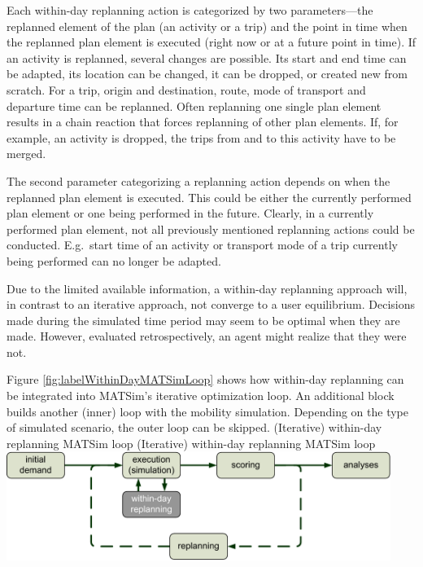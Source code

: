 Each within-day replanning action is categorized by two parameters---the replanned element of the plan (an activity or a trip) and the point in time when the replanned plan element is executed (right now or at a future point in time). If an activity is replanned, several changes are possible. Its start and end time can be adapted, its location can be changed, it can be dropped, or created new from scratch. For a trip, origin and destination, route, mode of transport and departure time can be replanned. Often replanning one single plan element results in a chain reaction that forces replanning of other plan elements. If, for example, an activity is dropped, the trips from and to this activity have to be merged.

The second parameter categorizing a replanning action depends on when the replanned plan element is executed. This could be either the currently performed plan element or one being performed in the future. Clearly, in a currently performed plan element, not all previously mentioned replanning actions could be conducted. E.g.\ start time of an activity or transport mode of a trip currently being performed can no longer be adapted.

Due to the limited available information, a within-day replanning approach will, in contrast to an iterative approach, not converge to a user equilibrium. Decisions made during the simulated time period may seem to be optimal when they are made. However, evaluated retrospectively, an agent might realize that they were not.

Figure \ref{fig:labelWithinDayMATSimLoop} shows how within-day replanning can be integrated into MATSim's iterative optimization loop. An additional block builds another (inner) loop with the mobility simulation. Depending on the type of simulated scenario, the outer loop can be skipped.
\createfigure%
{(Iterative) within-day replanning MATSim loop}%
{(Iterative) within-day replanning MATSim loop }%
{\label{fig:labelWithinDayMATSimLoop}}%
{\includegraphics[width=12.5cm, angle=0]{extending/figures/WithinDayReplanning/WithinDayMATSimLoop}}%
{}%

